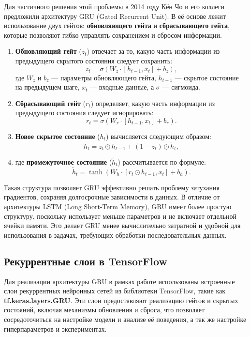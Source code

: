 Для частичного решения этой проблемы в 2014 году Кён Чо и его коллеги предложили архитектуру GRU (Gated Recurrent Unit). В её основе лежит использование двух гейтов: \textbf{обновляющего гейта} и \textbf{сбрасывающего гейта}, которые позволяют гибко управлять сохранением и сбросом информации.
\begin{enumerate}
\item \textbf{Обновляющий гейт} (\( z_t \)) отвечает за то, какую часть информации из предыдущего скрытого состояния следует сохранить:
  \[
  z_t = \sigma(W_z \cdot [h_{t-1}, x_t] + b_z),
  \]
  где \( W_z \) и \( b_z \) --- параметры обновляющего гейта, \( h_{t-1} \) --- скрытое состояние на предыдущем шаге, \( x_t \) --- входные данные, а \( \sigma \) --- сигмоида.

\item \textbf{Сбрасывающий гейт} (\( r_t \)) определяет, какую часть информации из предыдущего состояния следует игнорировать:
  \[
  r_t = \sigma(W_r \cdot [h_{t-1}, x_t] + b_r).
  \]

\item \textbf{Новое скрытое состояние} (\( h_t \)) вычисляется следующим образом:
\[
h_t = z_t \odot h_{t-1} + (1 - z_t) \odot \tilde{h}_t,
\]
\item где \textbf{промежуточное состояние} (\( \tilde{h}_t \)) рассчитывается по формуле:
\[
\tilde{h}_t = \tanh(W_h \cdot [r_t \odot h_{t-1}, x_t] + b_h).
\]
\end{enumerate}

Такая структура позволяет GRU эффективно решать проблему затухания градиентов, сохраняя долгосрочные зависимости в данных. В отличие от архитектуры LSTM (Long Short-Term Memory), GRU имеет более простую структуру, поскольку использует меньше параметров и не включает отдельной ячейки памяти. Это делает GRU менее вычислительно затратной и удобной для использования в задачах, требующих обработки последовательных данных.

\subsection{Рекуррентные слои в TensorFlow}
Для реализации архитектуры GRU в рамках работе использованы встроенные слои рекуррентных нейронных сетей из библиотеки TensorFlow, такие как \textbf{tf.keras.layers.GRU}\cite{tfgru}. Эти слои предоставляют реализацию гейтов и скрытых состояний, включая механизмы обновления и сброса, что позволяет сосредоточиться на настройке модели и анализе её поведения, а так же настройке гиперпараметров и экспериментах.

